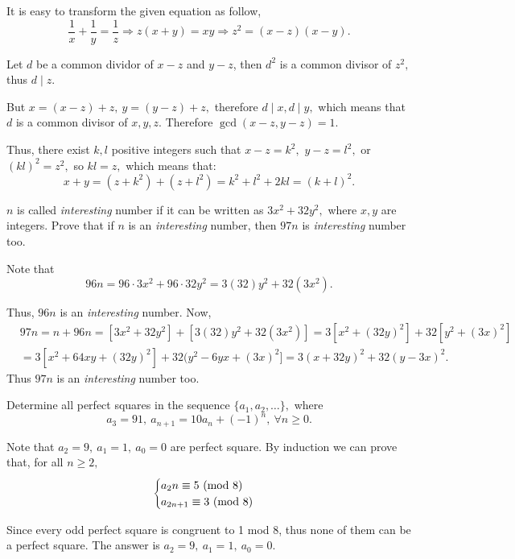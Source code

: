 \documentclass{article}
\begin{document}
\begin{soln}
    It is easy to transform the given equation as follow,
    \[
        \frac{1}{x} + \frac{1}{y} = \frac{1}{z} \Rightarrow z(x+y)  = xy \Rightarrow z^2 = (x-z)(x-y).
    \]

    Let $d$ be a common dividor of $x-z$ and $y-z$, then $d^2$ is a common divisor of $z^2,$ thus $d \mid z.$

    But $x = (x-z) + z,\ y= (y-z) + z,$ therefore $d \mid x, d\mid y,$ which means that $d$ is a common divisor of $x,y,z.$
    Therefore $\gcd(x-z, y-z) = 1.$

    Thus, there exist $k, l$ positive integers such that $x-z=k^2,$ $y-z=l^2,$ or $(kl)^2=z^2,$ so $kl=z,$ which means that:
    \[
        x+y = (z+k^2)+(z+l^2) = k^2+l^2 + 2kl = \boxed{(k+l)^2.}
    \]
\end{soln}

\begin{example*}[Example 9]
    $n$ is called \textit{interesting} number if it can be written as $3x^2 + 32y^2,$ where $x, y$ are integers.
    Prove that if $n$ is an \textit{interesting} number, then $97n$ is \textit{interesting} number too.
\end{example*}

\begin{soln}
    Note that
    \[
        96n = 96\cdot 3x^2 + 96 \cdot 32 y^2 = 3(32)y^2 + 32(3x^2).
    \]

    Thus, $96n$ is an \textit{interesting} number. Now,
    \[
        \begin{aligned}
            &97n = n+96n = \left[ 3x^2 + 32y^2 \right] + \left[ 3(32)y^2 + 32(3x^2)\right]
            = 3[x^2 + (32y)^2] + 32[y^2 + (3x)^2]\\
            &= 3[x^2 + 64xy + (32y)^2] + 32(y^2-6yx+(3x)^2]
            = 3(x+32y)^2 + 32(y-3x)^2.
        \end{aligned}
    \]
    Thus $97n$ is an \textit{interesting} number too.
\end{soln}

\begin{example*}[Example 10]
    Determine all perfect squares in the sequence $\{a_1, a_2, \ldots\},$ where
    \[
        a_3 = 91,\ a_{n+1} = 10a_n + (-1)^n,\ \forall n\ge 0.
    \]
\end{example*}

\begin{soln}
    Note that $a_2 = 9,\ a_1 = 1,\ a_0 = 0$ are perfect square. By induction we can prove that, for all $n \ge 2,$
    \[
        \begin{cases}
            a_2n \equiv 5 \ (\mathrm{mod}\ 8)\\
            a_{2n + 1} \equiv 3 \ (\mathrm{mod}\ 8)\\
        \end{cases}
    \]
    
    Since every odd perfect square is congruent to 1 mod 8, thus none of them can be a perfect square.
    The answer is $\boxed{a_2 = 9,\ a_1 = 1,\ a_0 = 0}.$
\end{soln}
    
\end{document}
